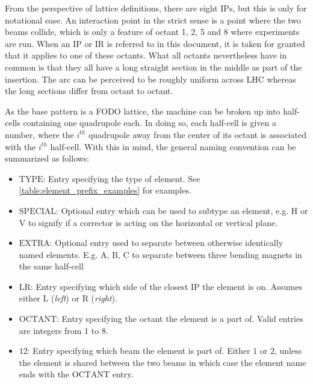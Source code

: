 From the perspective of lattice definitions, there are eight \(\mathrm{IP}\)s, but this is only for notational ease.
An interaction point in the strict sense is a point where the two beams collide, which is only a feature of octant 1, 2, 5 and 8 where experiments are run.
When an \(\mathrm{IP}\) or \(\mathrm{IR}\) is referred to in this document, it is taken for granted that it applies to one of these octants.
What all octants nevertheless have in common is that they all have a long straight section in the middle as part of the insertion.
The arc can be perceived to be roughly uniform across LHC whereas the long sections differ from octant to octant.


As the base pattern is a FODO lattice, the machine can be broken up into half-cells containing one quadrupole each.
In doing so, each half-cell is given a number, where the \(i^{th}\) quadrupole away from the center of its octant is associated with the \(i^{th}\) half-cell.
With this in mind, the general naming convention can be summarized as follows:


\begin{itemize}
    \item \(\mathrm{TYPE}\): Entry specifying the type of element. See \cref{table:element_prefix_examples} for examples.
    \item \(\mathrm{SPECIAL}\): Optional entry which can be used to subtype an element, e.g. \(\mathrm{H}\) or \(\mathrm{V}\) to signify if a corrector is acting on the horizontal or vertical plane.
    \item \(\mathrm{EXTRA}\): Optional entry used to separate between otherwise identically named elements. E.g. \(\mathrm{A}\), \(\mathrm{B}\), \(\mathrm{C}\) to separate between three bending magnets in the same half-cell
    \item \(\mathrm{LR}\): Entry specifying which side of the closest \(\mathrm{IP}\) the element is on. Assumes either \(\mathrm{L}\) (\textit{left}) or \(\mathrm{R}\) (\textit{right}).
    \item \(\mathrm{OCTANT}\): Entry specifying the octant the element is a part of. Valid entries are integers from \(1\) to \(8\).
    \item \(\mathrm{12}\): Entry specifying which beam the element is part of. Either \(1\) or \(2\), unless the element is shared between the two beams in which case the element name ends with the \(\mathrm{OCTANT}\) entry.
\end{itemize}

